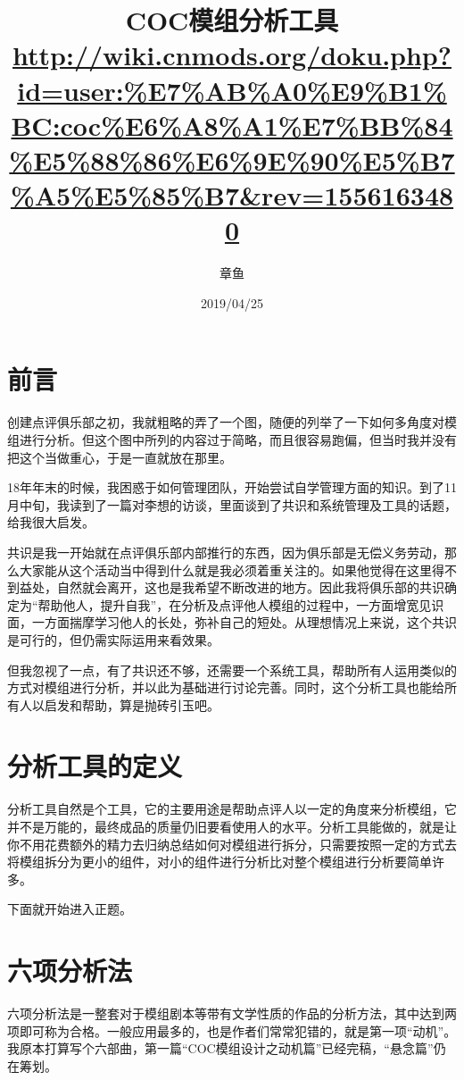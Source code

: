 \documentclass[a4paper,zihao=-4,notitlepage,twoside,openright]{ctexart}
\title{COC模组分析工具\\
{\footnotesize \url{http://wiki.cnmods.org/doku.php?id=user:\%E7\%AB\%A0\%E9\%B1\%BC:coc\%E6\%A8\%A1\%E7\%BB\%84\%E5\%88\%86\%E6\%9E\%90\%E5\%B7\%A5\%E5\%85\%B7&rev=1556163480}}}
\author{章鱼}
\date{2019/04/25}
\begin{document}
\maketitle

\section{前言}

创建点评俱乐部之初，我就粗略的弄了一个图，随便的列举了一下如何多角度对模组进行分析。但这个图中所列的内容过于简略，而且很容易跑偏，但当时我并没有把这个当做重心，于是一直就放在那里。

18年年末的时候，我困惑于如何管理团队，开始尝试自学管理方面的知识。到了11月中旬，我读到了一篇对李想的访谈，里面谈到了共识和系统管理及工具的话题，给我很大启发。

共识是我一开始就在点评俱乐部内部推行的东西，因为俱乐部是无偿义务劳动，那么大家能从这个活动当中得到什么就是我必须着重关注的。如果他觉得在这里得不到益处，自然就会离开，这也是我希望不断改进的地方。因此我将俱乐部的共识确定为“帮助他人，提升自我”，在分析及点评他人模组的过程中，一方面增宽见识面，一方面揣摩学习他人的长处，弥补自己的短处。从理想情况上来说，这个共识是可行的，但仍需实际运用来看效果。

但我忽视了一点，有了共识还不够，还需要一个系统工具，帮助所有人运用类似的方式对模组进行分析，并以此为基础进行讨论完善。同时，这个分析工具也能给所有人以启发和帮助，算是抛砖引玉吧。

\section{分析工具的定义}

分析工具自然是个工具，它的主要用途是帮助点评人以一定的角度来分析模组，它并不是万能的，最终成品的质量仍旧要看使用人的水平。分析工具能做的，就是让你不用花费额外的精力去归纳总结如何对模组进行拆分，只需要按照一定的方式去将模组拆分为更小的组件，对小的组件进行分析比对整个模组进行分析要简单许多。

下面就开始进入正题。

\section{六项分析法}

六项分析法是一整套对于模组剧本等带有文学性质的作品的分析方法，其中达到两项即可称为合格。一般应用最多的，也是作者们常常犯错的，就是第一项“动机”。我原本打算写个六部曲，第一篇“COC模组设计之动机篇”已经完稿，“悬念篇”仍在筹划。
\end{document}
